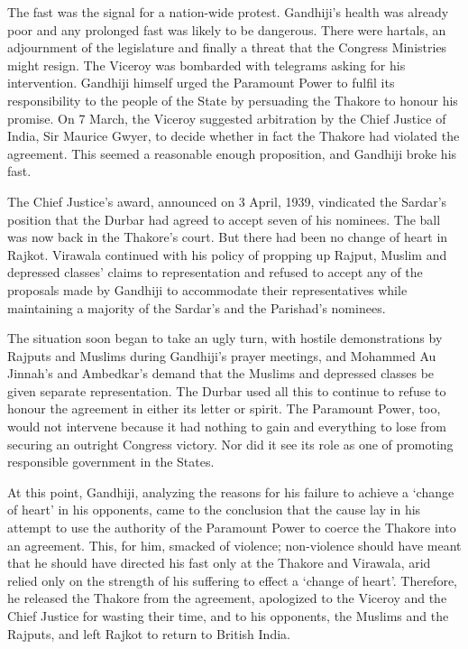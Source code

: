 The fast was the signal for a nation-wide protest. Gandhiji’s health was already poor and any prolonged fast was likely to be dangerous. There were hartals, an adjournment of the legislature and finally a threat that the Congress Ministries might resign. The Viceroy was bombarded with telegrams asking for his intervention. Gandhiji himself urged the Paramount Power to fulfil its responsibility to the people of the State by persuading the Thakore to honour his promise. On 7 March, the Viceroy suggested arbitration by the Chief Justice of India, Sir Maurice Gwyer, to decide whether in fact the Thakore had violated the agreement. This seemed a reasonable enough proposition, and Gandhiji broke his fast. 

The Chief Justice’s award, announced on 3 April, 1939, vindicated the Sardar’s position that the Durbar had agreed to accept seven of his nominees. The ball was now back in the Thakore’s court. But there had been no change of heart in Rajkot. Virawala continued with his policy of propping up Rajput, Muslim and depressed classes’ claims to representation and refused to accept any of the proposals made by Gandhiji to accommodate their representatives while maintaining a majority of the Sardar’s and the Parishad’s nominees. 

The situation soon began to take an ugly turn, with hostile demonstrations by Rajputs and Muslims during Gandhiji’s prayer meetings, and Mohammed Au Jinnah’s and Ambedkar’s demand that the Muslims and depressed classes be given separate representation. The Durbar used all this to continue to refuse to honour the agreement in either its letter or spirit. The Paramount Power, too, would not intervene because it had nothing to gain and everything to lose from securing an outright Congress victory. Nor did it see its role as one of promoting responsible government in the States. 

At this point, Gandhiji, analyzing the reasons for his failure to achieve a ‘change of heart’ in his opponents, came to the conclusion that the cause lay in his attempt to use the authority of the Paramount Power to coerce the Thakore into an agreement. This, for him, smacked of violence; non-violence should have meant that he should have directed his fast only at the Thakore and Virawala, arid relied only on the strength of his suffering to effect a ‘change of heart’. Therefore, he released the Thakore from the agreement, apologized to the Viceroy and the Chief Justice for wasting their time, and to his opponents, the Muslims and the Rajputs, and left Rajkot to return to British India. 

